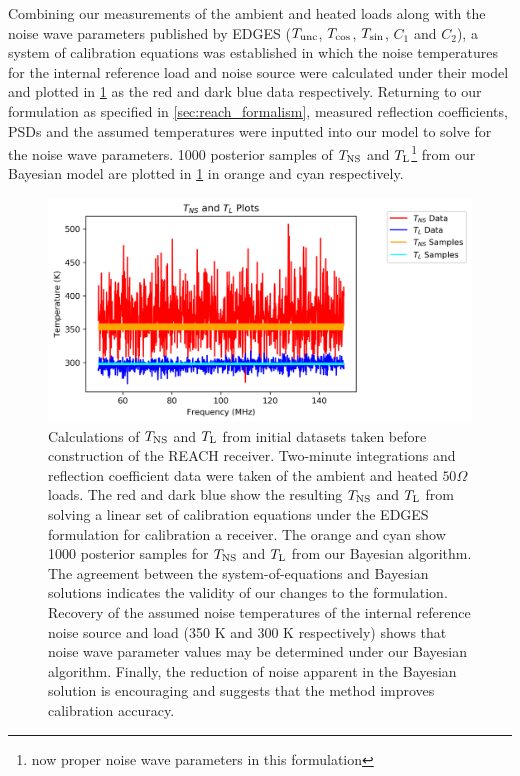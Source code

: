Combining our measurements of the ambient and heated loads along with the noise wave parameters published by EDGES ($T_{\mathrm{unc}}$, $T_{\mathrm{cos}}$, $T_{\mathrm{sin}}$, $C_1$ and $C_2$), a system of calibration equations was established in which the noise temperatures for the internal reference load and noise source were calculated under their model and plotted in \cref{fig:mphil_result} as the red and dark blue data respectively. Returning to our formulation as specified in \cref{sec:reach_formalism}, measured reflection coefficients, PSDs and the assumed temperatures were inputted into our model to solve for the noise wave parameters. 1000 posterior samples of $T_{\mathrm{NS}}$ and $T_{\mathrm{L}}$\footnote{now proper noise wave parameters in this formulation} from our Bayesian model are plotted in \cref{fig:mphil_result} in orange and cyan respectively.
\begin{figure}
    \centering
    \includegraphics[width=.8\textwidth]{mphil_result}
    \caption{Calculations of $T_{\mathrm{NS}}$ and $T_{\mathrm{L}}$ from initial datasets taken before construction of the REACH receiver. Two-minute integrations and reflection coefficient data were taken of the ambient and heated $50 \Omega$ loads. The red and dark blue show the resulting $T_{\mathrm{NS}}$ and $T_{\mathrm{L}}$ from solving a linear set of calibration equations under the EDGES formulation for calibration a receiver. The orange and cyan show 1000 posterior samples for $T_{\mathrm{NS}}$ and $T_{\mathrm{L}}$ from our Bayesian algorithm. The agreement between the system-of-equations and Bayesian solutions indicates the validity of our changes to the formulation. Recovery of the assumed noise temperatures of the internal reference noise source and load (350 K and 300 K respectively) shows that noise wave parameter values may be determined under our Bayesian algorithm. Finally, the reduction of noise apparent in the Bayesian solution is encouraging and suggests that the method improves calibration accuracy.}
    \label{fig:mphil_result}
\end{figure}

